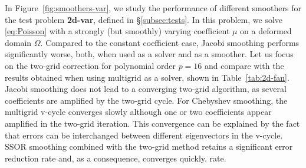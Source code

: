 \documentclass[smallcondensed,final]{svjour3}     %
\begin{document}
In Figure~\ref{fig:smoothers-var}, we study the performance of
different smoothers for the test problem {\bf 2d-var}, defined in
\S\ref{subsec:tests}. In this problem, we solve
\eqref{eq:Poisson} with a strongly (but smoothly) varying coefficient
$\mu$ on a deformed domain $\Omega$.  Compared to the constant
coefficient case, Jacobi smoothing performs significantly worse, both,
when used as a solver and as a smoother. Let us focus on the two-grid
correction for polynomial order $p=16$ and compare with the results
obtained when using multigrid as a solver, shown in Table~\ref{tab:2d-fan}.
Jacobi smoothing does not lead to a converging two-grid algorithm, as
several coefficients are amplified by the two-grid cycle. For
Chebyshev smoothing, the multigrid v-cycle converges slowly
although one or two coefficients appear amplified in the two-grid
iteration. This convergence can be explained by the fact that errors
can be interchanged between different eigenvectors in the v-cycle.
SSOR smoothing combined with the two-grid method retains a significant
error reduction rate and, as a consequence, converges quickly.
rate.
\end{document}
